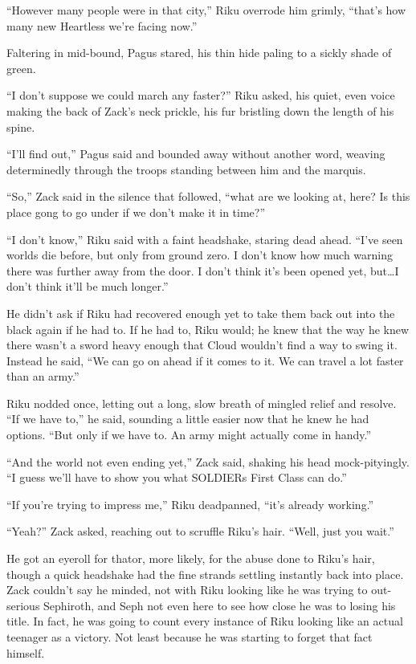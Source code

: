``However many people were in that city,'' Riku overrode him grimly, ``that's how many new Heartless we're facing now.''

Faltering in mid-bound, Pagus stared, his thin hide paling to a sickly shade of green.

``I don't suppose we could march any faster?'' Riku asked, his quiet, even voice making the back of Zack's neck prickle, his fur bristling down the length of his spine.

``I'll find out,'' Pagus said and bounded away without another word, weaving determinedly through the troops standing between him and the marquis.

``So,'' Zack said in the silence that followed, ``what are we looking at, here? Is this place gong to go under if we don't make it in time?''

``I don't know,'' Riku said with a faint headshake, staring dead ahead. ``I've seen worlds die before, but only from ground zero. I don't know how much warning there was further away from the door. I don't think it's been opened yet, but\ldots I don't think it'll be much longer.''

He didn't ask if Riku had recovered enough yet to take them back out into the black again if he had to. If he had to, Riku would; he knew that the way he knew there wasn't a sword heavy enough that Cloud wouldn't find a way to swing it. Instead he said, ``We can go on ahead if it comes to it. We can travel a lot faster than an army.''

Riku nodded once, letting out a long, slow breath of mingled relief and resolve. ``If we have to,'' he said, sounding a little easier now that he knew he had options. ``But only if we have to. An army might actually come in handy.''

``And the world not even ending yet,'' Zack said, shaking his head mock-pityingly. ``I guess we'll have to show you what SOLDIERs First Class can do.''

``If you're trying to impress me,'' Riku deadpanned, ``it's already working.''

``Yeah?'' Zack asked, reaching out to scruffle Riku's hair. ``Well, just you wait.''

He got an eyeroll for that\textemdash or, more likely, for the abuse done to Riku's hair, though a quick headshake had the fine strands settling instantly back into place. Zack couldn't say he minded, not with Riku looking like he was trying to out-serious Sephiroth, and Seph not even here to see how close he was to losing his title. In fact, he was going to count every instance of Riku looking like an actual teenager as a victory. Not least because he was starting to forget that fact himself.

